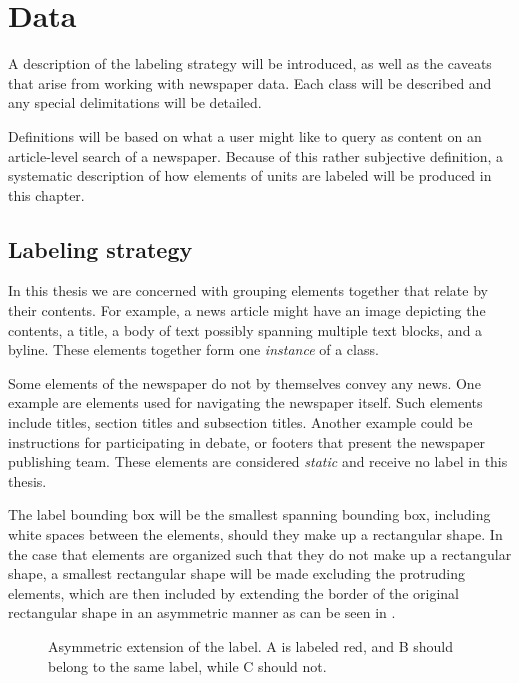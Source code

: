 \documentclass[oneside, english, bibtex]{kththesis}
\begin{document}
\section{Data}

A description of the labeling strategy will be introduced, as well as the caveats that arise from working with newspaper data.
Each class will be described and any special delimitations will be detailed.

Definitions will be based on what a user might like to query as content on an article-level search of a newspaper.
Because of this rather subjective definition, a systematic description of how elements of units are labeled will be produced in this chapter.

\subsection{Labeling strategy}
\label{subsec:labelingstrat}

In this thesis we are concerned with grouping elements together that relate by their contents.
For example, a news article might have an image depicting the contents, a title, a body of text possibly spanning multiple text blocks, and a byline.
These elements together form one \textit{instance} of a class.

Some elements of the newspaper do not by themselves convey any news. One example are elements used for navigating the newspaper itself.
Such elements include titles, section titles and subsection titles. Another example could be instructions for participating in debate, or footers that present the newspaper publishing team.
These elements are considered \textit{static} and receive no label in this thesis.

The label bounding box will be the smallest spanning bounding box, including white spaces between the elements, should they make up a rectangular shape.
In the case that elements are organized such that they do not make up a rectangular shape, a smallest rectangular shape will be made excluding the protruding elements,
which are then included by extending the border of the original rectangular shape in an asymmetric manner as can be seen in .

\begin{figure}[H]
\caption{Asymmetric extension of the label. A is labeled red, and B should belong to the same label, while C should not.}
\label{fig:asymextention}%
\end{figure}
\end{document}
